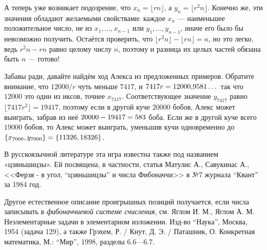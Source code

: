 А теперь уже возникает подозрение, что $x_n=\lfloor rn\rfloor$, а $y_n=\lfloor r^2 n\rfloor$.
Конечно же, эти значения обладают желаемыми свойствами:
каждое $x_n$ --- наименьшее положительное число, не из $x_1, \dots , x_{n-1}$ или $y_1, \dots, y_{n-1}$, иначе его было бы невозможно получить.
Остаётся проверить, что $\lfloor r^2 n\rfloor - \lfloor rn\rfloor = n$, но это легко, ведь $r^2 n - rn$ равно целому числу $n$,
поэтому и разница их целых частей обязана быть $n$ --- готово!

Забавы ради, давайте найдём ход Алекса из предложенных примеров.
Обратите внимание, что $12 000/r$ чуть меньше $7417$, и $7417r \z= 12 000{,}9581\dots$ так что $12 000$ это один из иксов, точнее $x_{7417}$.
Соответствующее значение $y_{7417}$ равно $\lfloor 7417r^2\rfloor = 19 417$, поэтому если в другой куче $20 000$ бобов, Алекс может выиграть, забрав из неё $20 000 \z- 19 417 = 583$ боба.
Если же в другой куче всего $19 000$ бобов, то Алекс может выиграть, уменьшив кучи одновременно до $\{x_{7000}, y_{7000}\} \z= \{11 326, 18 326\}$.

\begin{addedbytheeditors}
В русскоязычной литературе эта игра известна также под названием «цзяньшицзы».
Ей посвящена, в частности, статья Матулис А., Савукинас А., <<Ферзя - в угол, ``цзяньшицзы'' и числа Фибоначчи>> в №7 журнала ``Квант'' за 1984 год.

Другое естественное описание проигрышных позиций получается, если числа записывать в \textit{фибоначчиевой системе счисления}, см. Яглом И. М., Яглом А. М. 
Неэлементарные задачи в элементарном изложении.
Изд-во ``Наука'', Москва, 1954 (задача 129), а также Грэхем, Р. / Кнут, Д. Э. / Паташник, О. 
Конкретная математика, М.: ``Мир'', 1998, разделы 6.6---6.7.\pr
\end{addedbytheeditors}
